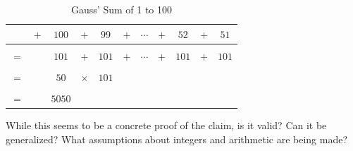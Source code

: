 \begin{example}
\begin{table}[H]
\begin{tabular}{ccccccccccc}
                &$+$&$100$&$+$&$99$&$+$&$\cdots$&$+$&$52$&$+$&$51$\\
                \hline\\
                $=$&&$101$&$+$&$101$&$+$&$\cdots$&$+$&$101$&$+$&$101$\\
                \hline\\
                $=$&&$50$&$\times$&$101$\\
                \hline\\
                $=$&&$5050$
            \end{tabular}
            \caption{Gauss' Sum of 1 to 100}
        \end{table}
        While this seems to be a concrete proof of the claim, is it valid? Can
        it be generalized? What assumptions about integers and arithmetic are
        being made?
    \end{example}
